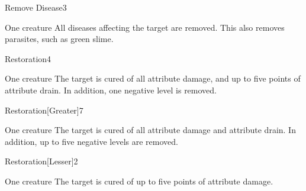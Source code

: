\begin{spellsection}{Remove Disease}{3}
\begin{spelltarget}{One creature}
    \spelleffect All diseases affecting the target are removed. This also removes parasites, such as green slime.
\end{spelltarget}
\end{spellsection}

\begin{spellsection}{Restoration}{4}
\begin{spelltarget}{One creature}
    \spelleffect The target is cured of all attribute damage, and up to five points of attribute drain. In addition, one negative level is removed.
\end{spelltarget}
\end{spellsection}

\begin{spellsection}{Restoration}[Greater]{7}
\begin{spelltarget}{One creature}
    \spelleffect The target is cured of all attribute damage and attribute drain. In addition, up to five negative levels are removed.
\end{spelltarget}
\end{spellsection}

\begin{spellsection}{Restoration}[Lesser]{2}
\begin{spelltarget}{One creature}
    \spelleffect The target is cured of up to five points of attribute damage.
\end{spelltarget}
\end{spellsection}

